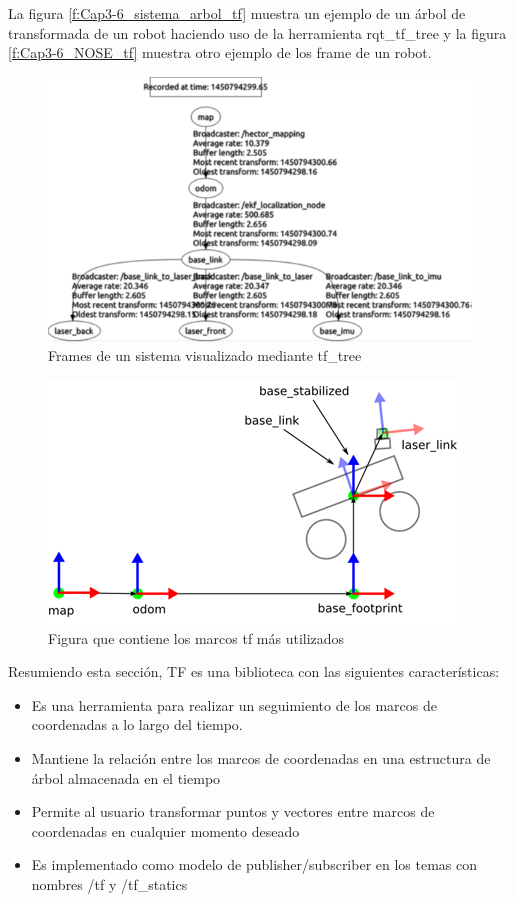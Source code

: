         \newpage
        La figura \eqref{f:Cap3-6_sistema_arbol_tf} muestra un ejemplo de un árbol de transformada de un robot haciendo uso de la herramienta rqt\_tf\_tree y la figura \eqref{f:Cap3-6_NOSE_tf} muestra otro ejemplo de los frame de un robot.
        
        \begin{figure}[htb]
            \centering
            \includegraphics[width=0.7\linewidth]{Main/Chapter3/Images3/3-6/ejemplo-frames-sistema-arbol.png}
            \caption{Frames de un sistema visualizado mediante tf\_tree}
            \label{f:Cap3-6_sistema_arbol_tf}
        \end{figure} 
        
        
        \begin{figure}[htb]
            \centering
            \includegraphics[width=0.6\linewidth]{Main/Chapter3/Images3/3-6/nose2.png}
            \caption{Figura que contiene los marcos tf más utilizados \cite{10.5555/2904061}}
            \label{f:Cap3-6_NOSE_tf}
        \end{figure} 
        
    
        Resumiendo esta sección, TF es una biblioteca con las siguientes características:
        
        \begin{itemize}
            \item Es una herramienta para realizar un seguimiento de los marcos de coordenadas a lo largo del tiempo.
            \item Mantiene la relación entre los marcos de coordenadas en una estructura de árbol almacenada en el tiempo
            \item Permite al usuario transformar puntos y vectores entre marcos de coordenadas en cualquier momento deseado
            \item Es implementado como modelo de publisher/subscriber en los temas con nombres /tf y /tf\_statics
        \end{itemize}
        
